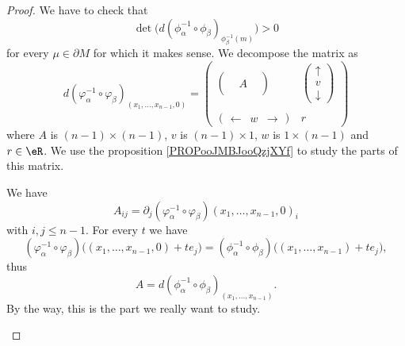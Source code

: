 \begin{proof}
	We have to check that
	\begin{equation}
		\det\big( d(\phi_{\alpha}^{-1}\circ\phi_{\beta})_{\phi^{-1}_{\beta}(m)} \big)>0
	\end{equation}
	for every \( \mu\in\partial M\) for which it makes sense. We decompose the matrix as
	\begin{equation}
		d(\varphi_{\alpha}^{-1}\circ\varphi_{\beta})_{(x_1,\ldots,x_{n-1},0)}=\begin{pmatrix}
			\begin{pmatrix}
				 &   & \\
				 & A & \\
				 &   &
			\end{pmatrix} &
			\begin{pmatrix}
				\uparrow \\
				v        \\
				\downarrow
			\end{pmatrix}      \\  \\
			\begin{pmatrix}
				\leftarrow & w & \rightarrow
			\end{pmatrix}
			                & r
		\end{pmatrix}
	\end{equation}
	where \( A\) is \( (n-1)\times (n-1)\), \( v\) is \( (n-1)\times 1\), \( w\) is \( 1\times (n-1)\) and \( r\in \eR\). We use the proposition \ref{PROPooJMBJooQzjXYf} to study the parts of this matrix.
	\begin{subproof}
		\spitem[Part \( A\)]
		We have
		\begin{equation}
			A_{ij}=\partial_j(\varphi_{\alpha}^{-1}\circ\varphi_{\beta})(x_1,\ldots,x_{n-1}, 0)_i
		\end{equation}
		with \( i,j\leq n-1\). For every \( t\) we have
		\begin{equation}
			(\varphi_{\alpha}^{-1}\circ\varphi_{\beta})\big( (x_1,\ldots,x_{n-1},0)+te_j \big)=(\phi_{\alpha}^{-1}\circ\phi_{\beta})\big( (x_1,\ldots,x_{n-1})+te_j \big),
		\end{equation}
		thus
		\begin{equation}
			A=d(\phi_{\alpha}^{-1}\circ\phi_{\beta})_{(x_1,\ldots,x_{n-1})}.
		\end{equation}
		By the way, this is the part we really want to study.


\end{subproof}
\end{proof}
